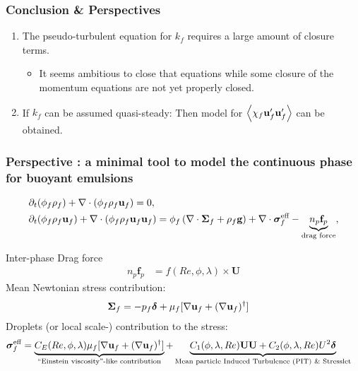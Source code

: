 \documentclass{sintefbeamer}
\begin{document}
\begin{frame}
  \frametitle{Conclusion \& Perspectives}

  \begin{enumerate}
    \item The pseudo-turbulent equation for $k_f$ requires a large amount of closure terms. 
    \begin{itemize}
      \item 
      It seems ambitious to close that equations while some closure of the momentum equations are not yet properly closed. 
    \end{itemize}
    \item If $k_f$ can be assumed quasi-steady: Then model for $\left<\chi_f\textbf{u}_f'\textbf{u}_f'\right>$ can be obtained. 
  \end{enumerate}

\end{frame}

\begin{frame}
  \frametitle{Perspective : a minimal tool to model the continuous phase for buoyant emulsions}


  \begin{align*}
    &\partial_t (\phi_f \rho_f)  
    + \mathbf{\nabla}\cdot (
        \phi_f \rho_f\textbf{u}_f
    )
    = 
    0,\\
    &\partial_t (\phi_f\rho_f \textbf{u}_f)
    + \mathbf{\nabla}\cdot (\phi_f\rho_f \textbf{u}_f\textbf{u}_f)
    = \phi_f 
    \left(\mathbf{\nabla}\cdot \bm{\Sigma}_f
    + \rho_f \textbf{g}\right)
    + \mathbf{\nabla}\cdot  \bm{\sigma}_f^{\text{eff}}
    - \underbrace{n_p \textbf{f}_p}_\text{drag force},
  \end{align*}
  \pause
  
Inter-phase Drag force 
  \begin{align*}
    n_p \textbf{f}_p  
    &= 
    f(Re,\phi, \lambda) \times \textbf{U}
  \end{align*}
Mean Newtonian stress contribution: 
\begin{align*}
  \bm\Sigma_f &= - p_f \bm\delta + \mu_f [\mathbf{\nabla} \textbf{u}_f +  (\mathbf{\nabla} \textbf{u}_f)^\dagger ] 
\end{align*}
Droplets  (or local scale-)  contribution to the stress:
\begin{align*}
    \bm{\sigma}^{\text{eff}}_f 
    &= \underbrace{C_E(Re,\phi,\lambda) \mu_f [\mathbf{\nabla} \textbf{u}_f +  (\mathbf{\nabla} \textbf{u}_f)^\dagger ] }_\text{``Einstein viscosity''-like contribution}
    + 
    \underbrace{
      C_1(\phi,\lambda,Re)\textbf{UU}
    + C_2(\phi,\lambda,Re)U^2 \bm\delta}_\text{Mean particle Induced Turbulence (PIT) \& Stresslet}
\end{align*}

\end{frame}
\backmatter
\end{document}
